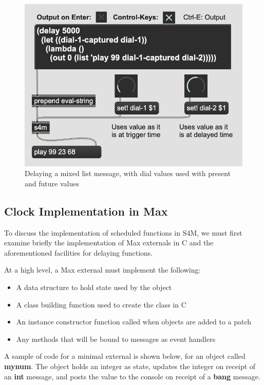 \documentclass[acmsmall]{acmart}
\begin{document}
\begin{figure}[H]
  \centering
  \includegraphics[width=.5\linewidth]{fig-6-s4m-delay}
  \caption{Delaying a mixed list message, with dial values used with present and future values}
\end{figure}

\subsection{Clock Implementation in Max}

To discuss the implementation of scheduled functions in S4M, we must first examine
briefly the implementation of Max externals in C and the aforementioned 
facilities for delaying functions.

At a high level, a Max external must implement the following:

\begin{itemize}
\item A data structure to hold state used by the object
\item A class building function used to create the class in C
\item An instance constructor function called when objects are added to a patch
\item Any methods that will be bound to messages as event handlers
\end{itemize}

A sample of code for a minimal external is shown below,
for an object called \textbf{mynum}. The object holds an integer as state,
updates the integer on receipt of an \textbf{int} 
message, and posts the value to the console on receipt of a \textbf{bang}
message.
\end{document}
